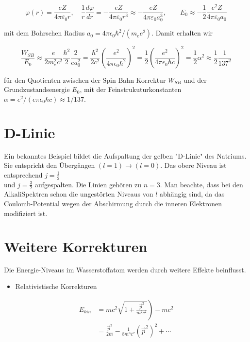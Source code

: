 \documentclass[10pt, letterpaper]{article}
\begin{document}
$$
\varphi(r)=\frac{e Z}{4 \pi \varepsilon_{0} r}, \quad \frac{1}{r} \frac{d \varphi}{d r}=-\frac{e Z}{4 \pi \varepsilon_{0} r^{3}} \approx-\frac{e Z}{4 \pi \varepsilon_{0} a_{0}^{3}}, \quad \quad E_{0} \approx-\frac{1}{2} \frac{e^{2} Z}{4 \pi \varepsilon_{0} a_{0}}
$$

mit dem Bohrschen Radius $a_{0}=4 \pi \epsilon_{0} \hbar^{2} /\left(m_{e} e^{2}\right)$. Damit erhalten wir

$$
\frac{W_{S B}}{E_{0}} \approx \frac{e}{2 m_{e}^{2} c^{2}} \frac{\hbar^{2}}{2} \frac{2}{e a_{0}^{2}}=\frac{\hbar^{2}}{2 c^{2}}\left(\frac{e^{2}}{4 \pi \epsilon_{0} \hbar^{2}}\right)^{2}=\frac{1}{2}\left(\frac{e^{2}}{4 \pi \epsilon_{0} \hbar c}\right)^{2}=\frac{1}{2} \alpha^{2} \approx \frac{1}{2} \frac{1}{137^{2}}
$$

für den Quotienten zwischen der Spin-Bahn Korrektur $W_{S B}$ und der Grundzustandsenergie $E_{0}$, mit der Feinstrukuturkonstanten $\alpha=e^{2} /\left(e \pi \epsilon_{0} \hbar c\right) \approx 1 / 137$.

\section*{D-Linie}
Ein bekanntes Beispiel bildet die Aufspaltung der gelben "D-Linie" des Natriums. Sie entspricht den Übergängen $(l=1) \rightarrow(l=0)$. Das obere Niveau ist entsprechend $j=\frac{1}{2}$\\
und $j=\frac{3}{2}$ aufgespalten. Die Linien gehören zu $n=3$. Man beachte, dass bei den AlkaliSpektren schon die ungestörten Niveaus von $l$ abhängig sind, da das Coulomb-Potential wegen der Abschirmung durch die inneren Elektronen modifiziert ist.

\section*{Weitere Korrekturen}
Die Energie-Niveaus im Wasserstoffatom werden durch weitere Effekte beinflusst.

\begin{itemize}
  \item Relativistische Korrekturen
\end{itemize}

$$
\begin{aligned}
E_{k i n} & \left.=m c^{2} \sqrt{1+\frac{\vec{p}^{2}}{m^{2} c^{2}}}\right)-m c^{2} \\
& =\frac{\vec{p}^{2}}{2 m}-\frac{1}{8 m^{3} c^{2}}\left(\vec{p}^{2}\right)^{2}+\cdots
\end{aligned}
$$
\end{document}
